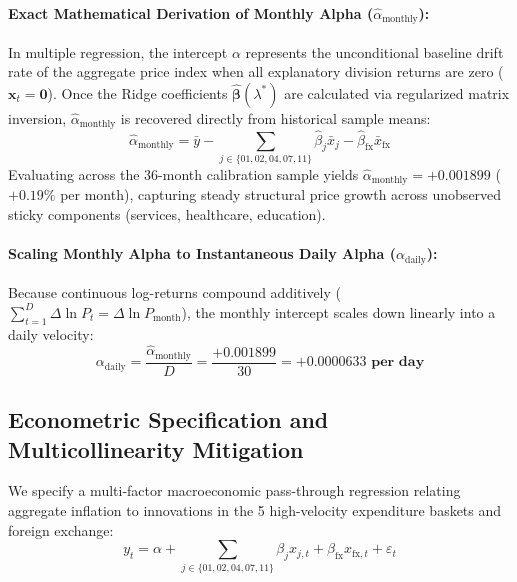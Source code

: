 \documentclass[a4paper, 11pt]{article}
\begin{document}
\paragraph{Exact Mathematical Derivation of Monthly Alpha ($\hat{\alpha}_{\text{monthly}}$):}
In multiple regression, the intercept $\alpha$ represents the unconditional baseline drift rate of the aggregate price index when all explanatory division returns are zero ($\mathbf{x}_t = \mathbf{0}$). Once the Ridge coefficients $\hat{\boldsymbol{\beta}}(\lambda^*)$ are calculated via regularized matrix inversion, $\hat{\alpha}_{\text{monthly}}$ is recovered directly from historical sample means:
\begin{equation}
    \boxed{\hat{\alpha}_{\text{monthly}} = \bar{y} - \sum_{j \in \{01, 02, 04, 07, 11\}} \hat{\beta}_j \bar{x}_j - \hat{\beta}_{\text{fx}} \bar{x}_{\text{fx}}}
\end{equation}
Evaluating across the 36-month calibration sample yields $\hat{\alpha}_{\text{monthly}} = \mathbf{+0.001899}$ ($+0.19\%$ per month), capturing steady structural price growth across unobserved sticky components (services, healthcare, education).

\paragraph{Scaling Monthly Alpha to Instantaneous Daily Alpha ($\alpha_{\text{daily}}$):}
Because continuous log-returns compound additively ($\sum_{t=1}^D \Delta \ln P_t = \Delta \ln P_{\text{month}}$), the monthly intercept scales down linearly into a daily velocity:
\begin{equation}
    \boxed{\alpha_{\text{daily}} = \frac{\hat{\alpha}_{\text{monthly}}}{D} = \frac{+0.001899}{30} = \mathbf{+0.0000633 \text{ per day}}}
\end{equation}

\subsection{Econometric Specification and Multicollinearity Mitigation}
We specify a multi-factor macroeconomic pass-through regression relating aggregate inflation to innovations in the 5 high-velocity expenditure baskets and foreign exchange:
\begin{equation}
    y_t = \alpha + \sum_{j \in \{01, 02, 04, 07, 11\}} \beta_j x_{j, t} + \beta_{\text{fx}} x_{\text{fx}, t} + \varepsilon_t
    \label{eq:macro_reg}
\end{equation}
\end{document}
